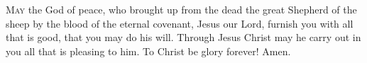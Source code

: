 
\lettrine{M}{ay} the God of peace, who brought up from the dead the great Shepherd of the sheep by the blood of the eternal covenant, Jesus our Lord, furnish you with all that is good, that you may do his will. Through Jesus Christ may he carry out in you all that is pleasing to him. To Christ be glory forever! Amen.
